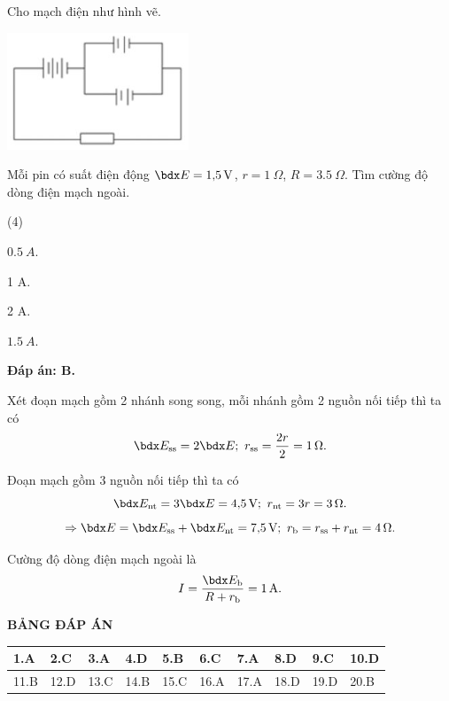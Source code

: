 \begin{enumerate}[label=\bfseries Câu \arabic*:]
	\cauhoi
	{Cho mạch điện như hình vẽ.
		\begin{center}
			\includegraphics{../figs/VN11-2021-PH-TP015-2.png}
		\end{center}
	Mỗi pin có suất điện động $\calE=\SI{1.5}{V}$, $r=\SI{1}{\Omega}$, $R=\SI{3.5}{\Omega}$. Tìm cường độ dòng điện mạch ngoài.
		
	}
	\loigiai
	{	\textbf{Đáp án: B.}
		
		Xét đoạn mạch gồm 2 nhánh song song, mỗi nhánh gồm 2 nguồn nối tiếp thì ta có
		$$\calE_\text{ss} = 2 \calE;\ r_\text{ss} = \dfrac{2r}{2} = \SI{1}{\Omega}.$$
		
		Đoạn mạch gồm 3 nguồn nối tiếp thì ta có
		$$\calE_\text{nt} = 3 \calE = \SI{4.5}{V};\ r_\text{nt} = 3r = \SI{3}{\Omega}.$$
		$$\Rightarrow \calE = \calE_\text{ss} + \calE_\text{nt} = \SI{7.5}{V};\ r_\text{b} = r_\text{ss} + r_\text{nt} = \SI{4}{\Omega}.$$
		
		Cường độ dòng điện mạch ngoài là
		$$I=\dfrac{\calE_\text b}{R+ r_\text b} = \SI{1}{A}.$$
	}
\end{enumerate}

\whiteBGstarEnd

\loigiai
{
	\begin{center}
		\textbf{BẢNG ĐÁP ÁN}
	\end{center}
	\begin{center}
		\begin{tabular}{|m{2.8em}|m{2.8em}|m{2.8em}|m{2.8em}|m{2.8em}|m{2.8em}|m{2.8em}|m{2.8em}|m{2.8em}|m{2.8em}|}
			\hline
			1.A  & 2.C  & 3.A  & 4.D  & 5.B  & 6.C  & 7.A  & 8.D  & 9.C  & 10.D  \\
			\hline
			11.B  & 12.D  & 13.C  & 14.B  & 15.C  & 16.A  & 17.A  & 18.D  & 19.D  & 20.B  \\
			\hline
		\end{tabular}
	\end{center}
}
